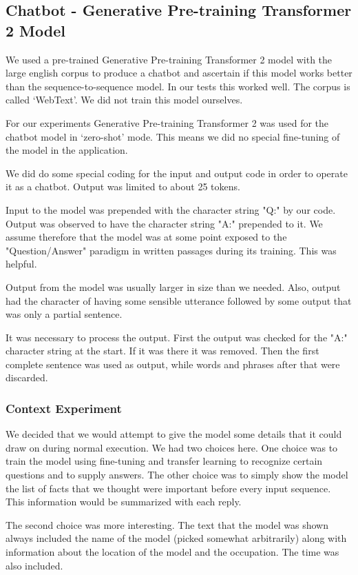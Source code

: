 \subsection{Chatbot - Generative Pre-training Transformer 2 Model}
We used a pre-trained Generative Pre-training Transformer 2 model with the large english corpus to produce a chatbot and ascertain if this model works better than the sequence-to-sequence model. In our tests this worked well. The corpus is called `WebText'. We did not train this model ourselves.

For our experiments Generative Pre-training Transformer 2 was used for the chatbot model in `zero-shot' mode. This means we did no special fine-tuning of the model in the application.

We did do some special coding for the input and output code in order to operate it as a chatbot. Output was limited to about 25 tokens. 

Input to the model was prepended with the character string "Q:" by our code. Output was observed to have the character string "A:" prepended to it. We assume therefore that the model was at some point exposed to the "Question/Answer" paradigm in written passages during its training. This was helpful.

Output from the model was usually larger in size than we needed. Also, output had the character of having some sensible utterance followed by some output that was only a partial sentence.

It was necessary to process the output. First the output was checked for the "A:" character string at the start. If it was there it was removed. Then the first complete sentence was used as output, while words and phrases after that were discarded.

\subsubsection{Context Experiment}
We decided that we would attempt to give the model some details that it could draw on during normal execution. We had two choices here. One choice was to train the model using fine-tuning and transfer learning to recognize certain questions and to supply answers. The other choice was to simply show the model the list of facts that we thought were important before every input sequence. This information would be summarized with each reply.

The second choice was more interesting. The text that the model was shown always included the name of the model (picked somewhat arbitrarily) along with information about the location of the model and the occupation. The time was also included.

